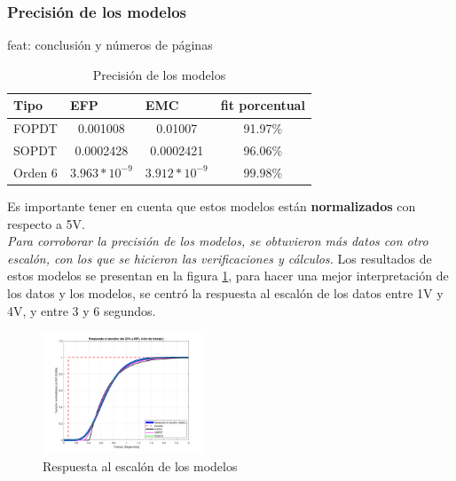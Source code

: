 \documentclass[letterpaper, 10 pt, conference]{ieeeconf}  %
\begin{document}
\vspace{1em}

\subsubsection{Precisión de los modelos}


feat: conclusión y números de páginas
\begin{table}[H]
\centering
\begin{tabular}{|l|c|c|c|}
\hline
\textbf{Tipo} & \multicolumn{1}{l|}{\textbf{EFP}}     & \multicolumn{1}{l|}{\textbf{EMC}}     & \multicolumn{1}{l|}{\textbf{fit porcentual}} \\ \hline
FOPDT   & 0.001008                     & 0.01007                      & 91.97\%                             \\ \hline
SOPDT   & 0.0002428                    & 0.0002421                    & 96.06\%                             \\ \hline
Orden 6 & $3.963*10^{-9}$ & $3.912*10^{-9}$ & $99.98\%$                             \\ \hline
\end{tabular}
  \caption{Precisión de los modelos}
  \label{tab:precision_modelos}
\end{table}

Es importante tener en cuenta que estos modelos están \textbf{normalizados} con respecto a 5V. \\

\textit{Para corroborar la precisión de los modelos, se obtuvieron más datos con otro escalón, con los que se hicieron las verificaciones y cálculos.}
Los resultados de estos modelos se presentan en la figura \ref{fig:resp_esc_modelos}, para hacer una mejor interpretación de los datos y los modelos, se centró la respuesta al escalón de los datos entre 1V y 4V, y entre 3 y 6 segundos.

\begin{figure}[H]
  \centering
  \includegraphics[width=0.43\textwidth]{./IMAGENES/resp_esc.png}
  \caption{Respuesta al escalón de los modelos}
  \label{fig:resp_esc_modelos}
\end{figure}
\end{document}
